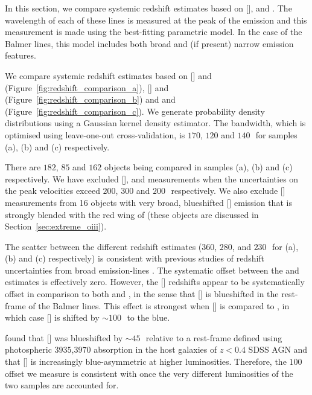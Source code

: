 In this section, we compare systemic redshift estimates based on [], \hb and \hans. 
The wavelength of each of these lines is measured at the peak of the emission and this measurement is made using the best-fitting parametric model. 
In the case of the Balmer lines, this model includes both broad and (if present) narrow emission features. 

We compare systemic redshift estimates based on [] and \hb (Figure~\ref{fig:redshift_comparison_a}), [] and \ha (Figure~\ref{fig:redshift_comparison_b}) and \hb and \ha (Figure~\ref{fig:redshift_comparison_c}). 
We generate probability density distributions using a Gaussian kernel density estimator.
The bandwidth, which is optimised using leave-one-out cross-validation, is $170$, $120$ and $140$\,\kms\, for samples (a), (b) and (c) respectively. 

There are $182$, $85$ and $162$ objects being compared in samples (a), (b) and (c) respectively. 
We have excluded [], \hb and \ha measurements when the uncertainties on the peak velocities exceed $200$, $300$ and $200$\,\kms\, respectively. 
We also exclude [] measurements from 16 objects with very broad, blueshifted [] emission that is strongly blended with the red wing of \hb (these objects are discussed in Section~\ref{sec:extreme_oiii}).

The scatter between the different redshift estimates ($360$, $280$, and $230$\,\kms\, for (a), (b) and (c) respectively) is consistent with previous studies of redshift uncertainties from broad emission-lines \citep[e.g.][]{shen16b}. 
The systematic offset between the \ha and \hb estimates is effectively zero. 
However, the [] redshifts appear to be systematically offset in comparison to both \ha and \hbns, in the sense that [] is blueshifted in the rest-frame of the Balmer lines. 
This effect is strongest when [] is compared to \hbns, in which case [] is shifted by $\sim100$\,\kms\, to the blue.

\citet{hewett10} found that [] was blueshifted by $\sim45$\,\kms\, relative to a rest-frame defined using photospheric \ll$3935$,$3970$ absorption in the host galaxies of $z<0.4$ SDSS AGN and that [] is increasingly blue-asymmetric at higher luminosities. 
Therefore, the $100$\,\kms offset we measure is consistent with \citet{hewett10} once the very different luminosities of the two samples are accounted for. 

